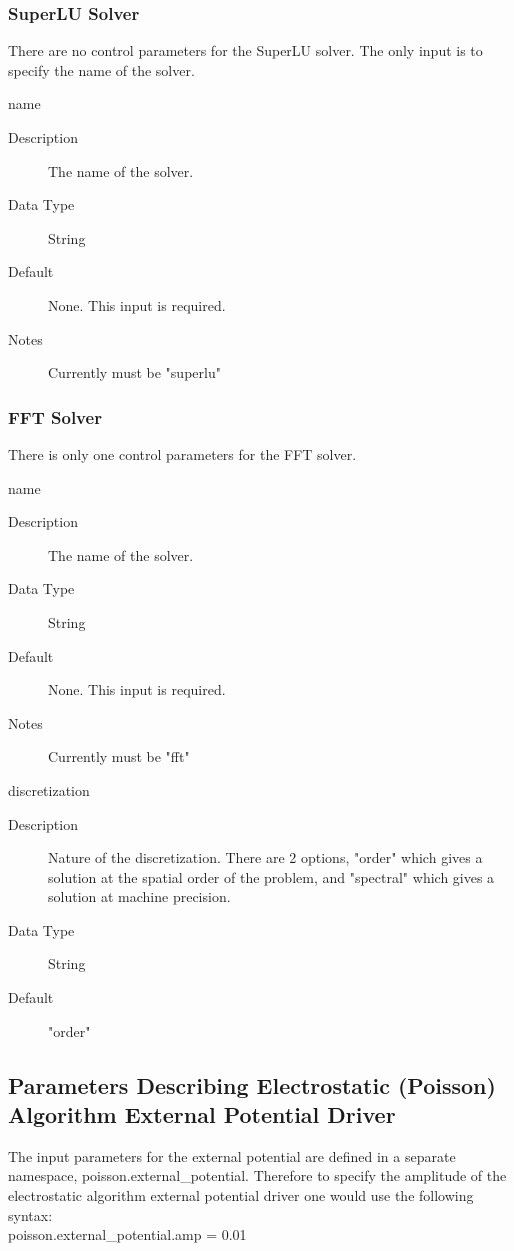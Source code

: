 \documentclass[11pt]{amsart}
\begin{document}
\subsubsection*{SuperLU Solver}
There are no control parameters for the SuperLU solver.  The only input is to
specify the name of the solver.

name
\begin{description}
\item [Description] The name of the solver.
\item [Data Type] String
\item [Default] None.  This input is required.
\item [Notes] Currently must be  "superlu"
\end{description}

\subsubsection*{FFT Solver}
There is only one control parameters for the FFT solver.

name
\begin{description}
\item [Description] The name of the solver.
\item [Data Type] String
\item [Default] None.  This input is required.
\item [Notes] Currently must be  "fft"
\end{description}

discretization
\begin{description}
\item [Description] Nature of the discretization.  There are 2 options, "order"
which gives a solution at the spatial order of the problem, and "spectral"
which gives a solution at machine precision.
\item [Data Type] String
\item [Default] "order"
\end{description}

\subsection*{Parameters Describing Electrostatic (Poisson) Algorithm External Potential Driver}
The input parameters for the external potential are defined in a separate
namespace, poisson.external\_potential.  Therefore to specify the amplitude of
the electrostatic algorithm external potential driver one would use the
following syntax: \\
poisson.external\_potential.amp = 0.01
\end{document}
